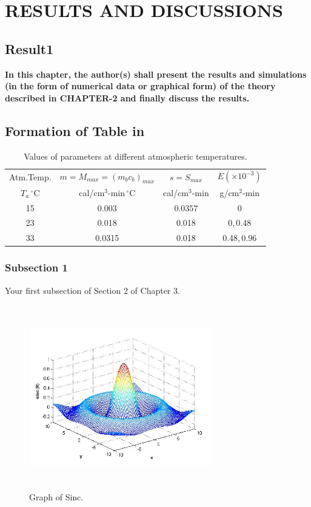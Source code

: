 
\chapter{RESULTS AND DISCUSSIONS}

\section{{\bf{Result1}}}
{\bf\color{red}In this chapter, the author(s) shall present the results and simulations (in the form of numerical data or graphical form) of the theory described in CHAPTER-2 and finally discuss the results.
}

\section{\bf Formation of Table in \LaTeXe}


\begin{table}[htpb]
\caption{Values of parameters at different atmospheric temperatures.}
\begin{center}
\begin{tabular}{|c | c | c | c |}
\hline
Atm.Temp. & $m = M_{max}= (m_bc_b)_{max}$ & $s = S_{max}$  & $E(\times 10^{-3})$\\
$T_a\,^{\circ}\mathrm{C}$ & cal/cm$^3$-min$\,^{\circ}\mathrm{C}$ & cal/cm$^3$-min & g/cm$^2$-min\\
\hline
15 & 0.003 & 0.0357 & 0\\
23 & 0.018  & 0.018 & 0,\,0.48\\
33 & 0.0315 & 0.018 & 0.48,\,0.96\\
\hline
\end{tabular}
\end{center}
\label{tabl5.1}
\end{table}
\newpage
\subsection{\bf Subsection 1}
Your first subsection of Section 2 of Chapter 3.
\begin{figure}[htpb]
	\begin{center}
		\includegraphics[height=8cm, width=8cm]{figures/msinc.jpg}
		\caption{Graph of Sinc.}
		\label{fig1.1}
	\end{center}
\end{figure}

